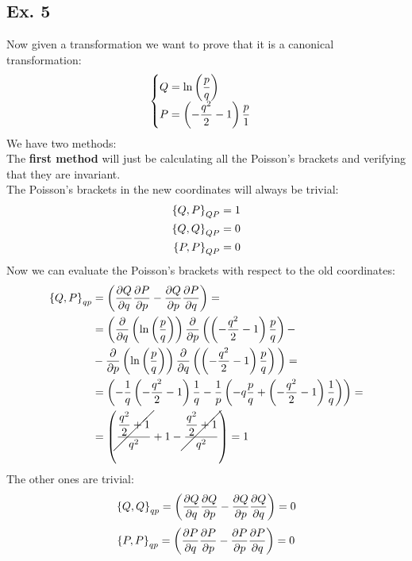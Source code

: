 \subsection{Ex. 5}
Now given a transformation we want to prove that it is a canonical transformation:
\begin{equation}
    \begin{cases}
        Q = \ln \left(\dfrac{p}{q}\right)\\
        P = \left(-\dfrac{q^2}{2}-1\right)\dfrac{p}{1}
    \end{cases}
\end{equation}
We have two methods:\\
The \textbf{first method} will just be calculating all the Poisson's brackets and verifying that they are invariant.\\
The Poisson's brackets in the new coordinates will always be trivial:
\begin{equation}
    \begin{split}
        \left\{Q,P\right\}_{QP} &= 1\\
        \left\{Q,Q\right\}_{QP} &= 0\\
        \left\{P,P\right\}_{QP} &= 0
    \end{split}
\end{equation}
Now we can evaluate the Poisson's brackets with respect to the old coordinates:
\begin{equation}
    \begin{split}
        \left\{Q,P\right\}_{qp} &= \left(\dfrac{\partial Q}{\partial q} \dfrac{\partial P}{\partial p} - \dfrac{\partial Q}{\partial p} \dfrac{\partial P}{\partial q} \right) = \\
        &= \bigg(\dfrac{\partial }{\partial q}\left(\ln\left(\dfrac{p}{q}\right)\right) \dfrac{\partial }{\partial p}\left(\left(-\dfrac{q^2}{2}-1\right)\dfrac{p}{q}\right) -\\
        &- \dfrac{\partial }{\partial p}\left(\ln\left(\dfrac{p}{q}\right)\right) \dfrac{\partial }{\partial q}\left(\left(-\dfrac{q^2}{2}-1\right)\dfrac{p}{q}\right) \bigg) = \\
        &= \left(-\dfrac{1}{q}  \left(-\dfrac{q^2}{2}-1\right)  \dfrac{1}{q} - \dfrac{1}{p}  \left(-q  \dfrac{p}{q} + \left(-\dfrac{q^2}{2}-1\right)  \dfrac{1}{q}\right) \right) = \\
        &= \left(\cancel{\dfrac{\dfrac{q^2}{2} + 1}{q^2}} + 1 - \cancel{\dfrac{\dfrac{q^2}{2} + 1}{q^2}} \right) = 1
    \end{split}
\end{equation}
The other ones are trivial:
\begin{equation}
    \left\{Q,Q\right\}_{qp} = \left(\dfrac{\partial Q}{\partial q} \dfrac{\partial Q}{\partial p} - \dfrac{\partial Q}{\partial p} \dfrac{\partial Q}{\partial q} \right) = 0
\end{equation}
\begin{equation}
    \left\{P,P\right\}_{qp} = \left(\dfrac{\partial P}{\partial q} \dfrac{\partial P}{\partial p} - \dfrac{\partial P}{\partial p} \dfrac{\partial P}{\partial q} \right) = 0
\end{equation}

